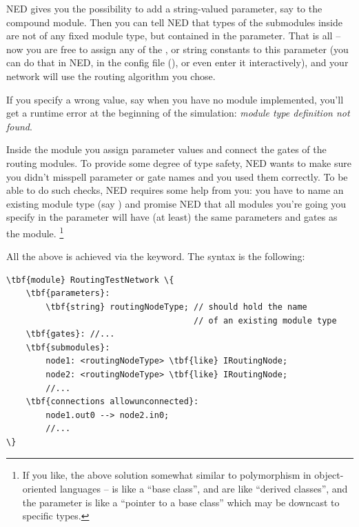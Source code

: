 NED gives you the possibility to add a string-valued parameter,
say  to the  compound module.
Then you can tell NED that types of the submodules inside 
are not of any fixed module type, but contained in the 
parameter. That is all -- now you are free to assign any of
the ,  or
 string constants to this parameter
(you can do that in NED, in the config file (),
or even enter it interactively),
and your network will use the routing algorithm you chose.

If you specify a wrong value, say 
when you have no  module implemented,
you'll get a runtime error at the beginning of the simulation:
\textit{module type definition not found}.

Inside the  module you assign parameter values
and connect the gates of the routing modules. To provide some degree
of type safety, NED wants to make sure you didn't misspell
parameter or gate names and you used them correctly.
To be able to do such checks, NED requires some help from you:
you have to name an existing module type (say )
and promise NED that all modules you're going you specify
in the  parameter will have (at least) the same
parameters and gates as the  module.
  \footnote{If you like, the above solution somewhat similar to polymorphism
  in object-oriented languages --  is like a
  ``base class'',  and 
  are like ``derived classes'', and the  parameter
  is like a ``pointer to a base class'' which may be downcast to specific
  types.}

All the above is achieved via the  keyword.
The syntax is the following:

\begin{Verbatim}[commandchars=\\\{\}]
\tbf{module} RoutingTestNetwork \{
    \tbf{parameters}:
        \tbf{string} routingNodeType; // should hold the name
                                      // of an existing module type
    \tbf{gates}: //...
    \tbf{submodules}:
        node1: <routingNodeType> \tbf{like} IRoutingNode;
        node2: <routingNodeType> \tbf{like} IRoutingNode;
        //...
    \tbf{connections allowunconnected}:
        node1.out0 --> node2.in0;
        //...
\}
\end{Verbatim}


